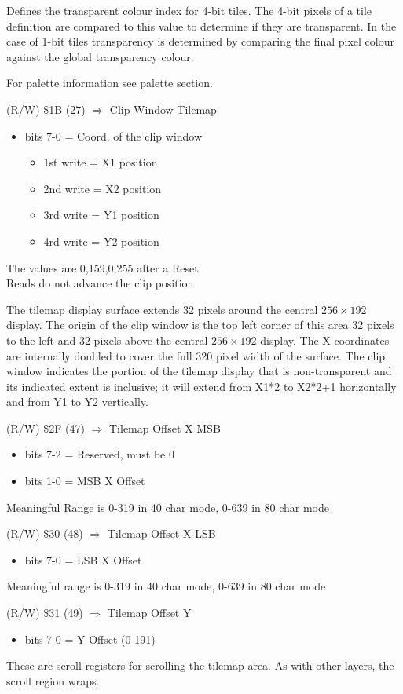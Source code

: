 Defines the transparent colour index for 4-bit tiles. The 4-bit pixels
of a tile definition are compared to this value to determine if they
are transparent. In the case of 1-bit tiles transparency is determined
by comparing the final pixel colour against the global transparency
colour.

For palette information see palette section.

(R/W) \$1B (27) $\Rightarrow$ Clip Window Tilemap
\begin{itemize}
\item[] bits 7-0 = Coord. of the clip window
  \begin{itemize}
  \item[] 1st write = X1 position
  \item[] 2nd write = X2 position
  \item[] 3rd write = Y1 position
  \item[] 4rd write = Y2 position
  \end{itemize}
\end{itemize}
The values are 0,159,0,255 after a Reset\\
Reads do not advance the clip position

The tilemap display surface extends 32 pixels around the central
$256\times192$ display. The origin of the clip window is the top left
corner of this area 32 pixels to the left and 32 pixels above the
central $256\times192$ display. The X coordinates are internally
doubled to cover the full 320 pixel width of the surface. The clip
window indicates the portion of the tilemap display that is
non-transparent and its indicated extent is inclusive; it will extend
from X1*2 to X2*2+1 horizontally and from Y1 to Y2 vertically.

(R/W) \$2F (47) $\Rightarrow$ Tilemap Offset X MSB
\begin{itemize}
\item[] bits 7-2 = Reserved, must be 0
\item[] bits 1-0 = MSB X Offset
\end{itemize}
Meaningful Range is 0-319 in 40 char mode, 0-639 in 80 char mode

(R/W) \$30 (48) $\Rightarrow$ Tilemap Offset X LSB
\begin{itemize}
\item[] bits 7-0 = LSB X Offset
\end{itemize}
Meaningful range is 0-319 in 40 char mode, 0-639 in 80 char mode

(R/W) \$31 (49) $\Rightarrow$ Tilemap Offset Y
\begin{itemize}
\item[] bits 7-0 = Y Offset (0-191)
\end{itemize}
These are scroll registers for scrolling the tilemap area. As with
other layers, the scroll region wraps.

